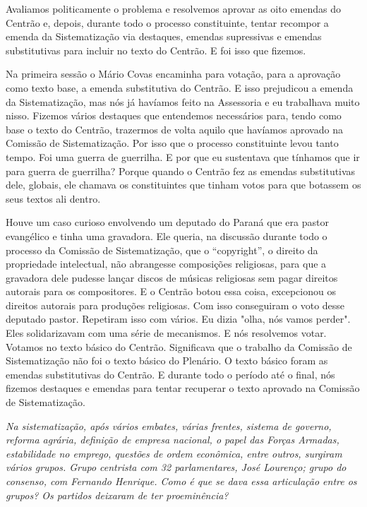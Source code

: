 Avaliamos politicamente o problema e resolvemos aprovar as oito emendas
do Centrão e, depois, durante todo o processo constituinte, tentar
recompor a emenda da Sistematização via destaques, emendas supressivas e
emendas substitutivas para incluir no texto do Centrão. E foi isso que
fizemos.

Na primeira sessão o Mário Covas encaminha para votação, para a
aprovação como texto base, a emenda substitutiva do Centrão. E isso
prejudicou a emenda da Sistematização, mas nós já havíamos feito na
Assessoria e eu trabalhava muito nisso. Fizemos vários destaques que
entendemos necessários para, tendo como base o texto do Centrão,
trazermos de volta aquilo que havíamos aprovado na Comissão de
Sistematização. Por isso que o processo constituinte levou tanto tempo.
Foi uma guerra de guerrilha. E por que eu sustentava que tínhamos que ir
para guerra de guerrilha? Porque quando o Centrão fez as emendas
substitutivas dele, globais, ele chamava os constituintes que tinham
votos para que botassem os seus textos ali dentro.

Houve um caso curioso envolvendo um deputado do Paraná que era pastor
evangélico e tinha uma gravadora. Ele queria, na discussão durante todo
o processo da Comissão de Sistematização, que o ``copyright'', o direito
da propriedade intelectual, não abrangesse composições religiosas, para
que a gravadora dele pudesse lançar discos de músicas religiosas sem
pagar direitos autorais para os compositores. E o Centrão botou essa
coisa, excepcionou os direitos autorais para produções religiosas. Com
isso conseguiram o voto desse deputado pastor. Repetiram isso com
vários. Eu dizia "olha, nós vamos perder". Eles solidarizavam com uma
série de mecanismos. E nós resolvemos votar. Votamos no texto básico do
Centrão. Significava que o trabalho da Comissão de Sistematização não
foi o texto básico do Plenário. O texto básico foram as emendas
substitutivas do Centrão. E durante todo o período até o final, nós
fizemos destaques e emendas para tentar recuperar o texto aprovado na
Comissão de Sistematização.

\medskip

\emph{Na sistematização, após vários embates, várias frentes, sistema
de governo, reforma agrária, definição de empresa nacional, o papel das
Forças Armadas, estabilidade no emprego, questões de ordem econômica,
entre outros, surgiram vários grupos. Grupo centrista com 32
parlamentares, José Lourenço; grupo do consenso, com Fernando Henrique.
Como é que se dava essa articulação entre os grupos? Os partidos
deixaram de ter proeminência?}

